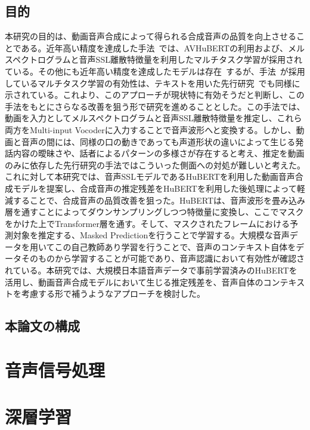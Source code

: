 \documentclass[12pt]{jarticle}
\numberwithin{equation}{section}    %
\numberwithin{figure}{section}      %
\numberwithin{table}{section}      %
\begin{document}
\subsection{目的}
本研究の目的は、動画音声合成によって得られる合成音声の品質を向上させることである。近年高い精度を達成した手法~\cite{choi2023intelligible}では、AVHuBERTの利用および、メルスペクトログラムと音声SSL離散特徴量を利用したマルチタスク学習が採用されている。その他にも近年高い精度を達成したモデルは存在~\cite{hsu2023revise,sahipjohn2023robustl2s,kim2024let}するが、手法~\cite{choi2023intelligible}が採用しているマルチタスク学習の有効性は、テキストを用いた先行研究~\cite{kim2023lip_multitask}でも同様に示されている。これより、このアプローチが現状特に有効そうだと判断し、この手法をもとにさらなる改善を狙う形で研究を進めることとした。この手法では、動画を入力としてメルスペクトログラムと音声SSL離散特徴量を推定し、これら両方をMulti-input Vocoderに入力することで音声波形へと変換する。しかし、動画と音声の間には、同様の口の動きであっても声道形状の違いによって生じる発話内容の曖昧さや、話者によるパターンの多様さが存在すると考え、推定を動画のみに依存した先行研究の手法ではこういった側面への対処が難しいと考えた。これに対して本研究では、音声SSLモデルであるHuBERTを利用した動画音声合成モデルを提案し、合成音声の推定残差をHuBERTを利用した後処理によって軽減することで、合成音声の品質改善を狙った。HuBERTは、音声波形を畳み込み層を通すことによってダウンサンプリングしつつ特徴量に変換し、ここでマスクをかけた上でTransformer層を通す。そして、マスクされたフレームにおける予測対象を推定する、Masked Predictionを行うことで学習する。大規模な音声データを用いてこの自己教師あり学習を行うことで、音声のコンテキスト自体をデータそのものから学習することが可能であり、音声認識において有効性が確認されている。本研究では、大規模日本語音声データで事前学習済みのHuBERTを活用し、動画音声合成モデルにおいて生じる推定残差を、音声自体のコンテキストを考慮する形で補うようなアプローチを検討した。

\subsection{本論文の構成}
\clearpage

\section{音声信号処理}
\clearpage

\section{深層学習}
\clearpage
\end{document}
